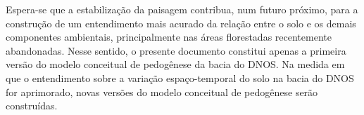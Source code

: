 Espera-se que a estabilização da paisagem contribua, num futuro próximo, para a construção de um entendimento 
mais acurado da relação entre o solo e os demais componentes ambientais, principalmente nas áreas florestadas 
recentemente abandonadas. Nesse sentido, o presente documento constitui apenas a primeira versão do modelo 
conceitual de pedogênese da bacia do DNOS. Na medida em que o entendimento sobre a variação espaço-temporal do 
solo na bacia do DNOS for aprimorado, novas versões do modelo conceitual de pedogênese serão construídas.


